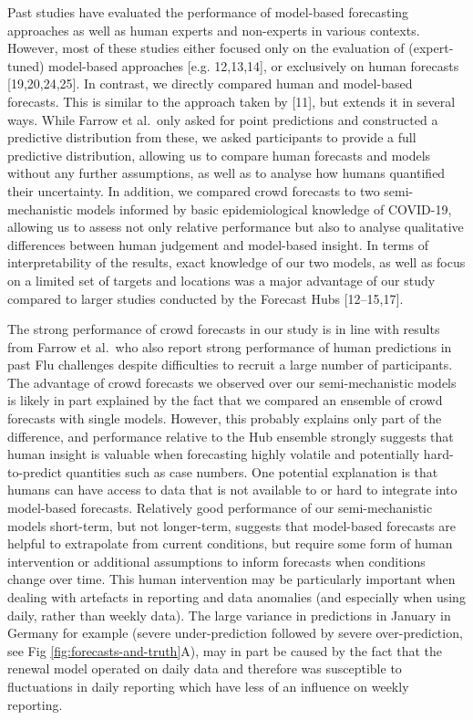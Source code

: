 \documentclass[10pt,letterpaper]{article}
\begin{document}
Past studies have evaluated the performance of model-based forecasting
approaches as well as human experts and non-experts in various contexts.
However, most of these studies either focused only on the evaluation of
(expert-tuned) model-based approaches {[}e.g. 12,13,14{]}, or
exclusively on human forecasts {[}19,20,24,25{]}. In contrast, we
directly compared human and model-based forecasts. This is similar to
the approach taken by {[}11{]}, but extends it in several ways. While
Farrow et al.~only asked for point predictions and constructed a
predictive distribution from these, we asked participants to provide a
full predictive distribution, allowing us to compare human forecasts and
models without any further assumptions, as well as to analyse how humans
quantified their uncertainty. In addition, we compared crowd forecasts
to two semi-mechanistic models informed by basic epidemiological
knowledge of COVID-19, allowing us to assess not only relative
performance but also to analyse qualitative differences between human
judgement and model-based insight. In terms of interpretability of the
results, exact knowledge of our two models, as well as focus on a
limited set of targets and locations was a major advantage of our study
compared to larger studies conducted by the Forecast Hubs
{[}12--15,17{]}.

The strong performance of crowd forecasts in our study is in line with
results from Farrow et al.~who also report strong performance of human
predictions in past Flu challenges despite difficulties to recruit a
large number of participants. The advantage of crowd forecasts we
observed over our semi-mechanistic models is likely in part explained by
the fact that we compared an ensemble of crowd forecasts with single
models. However, this probably explains only part of the difference, and
performance relative to the Hub ensemble strongly suggests that human
insight is valuable when forecasting highly volatile and potentially
hard-to-predict quantities such as case numbers. One potential
explanation is that humans can have access to data that is not available
to or hard to integrate into model-based forecasts. Relatively good
performance of our semi-mechanistic models short-term, but not
longer-term, suggests that model-based forecasts are helpful to
extrapolate from current conditions, but require some form of human
intervention or additional assumptions to inform forecasts when
conditions change over time. This human intervention may be particularly
important when dealing with artefacts in reporting and data anomalies
(and especially when using daily, rather than weekly data). The large
variance in predictions in January in Germany for example (severe
under-prediction followed by severe over-prediction, see Fig
\ref{fig:forecasts-and-truth}A), may in part be caused by the fact that
the renewal model operated on daily data and therefore was susceptible
to fluctuations in daily reporting which have less of an influence on
weekly reporting.
\end{document}
